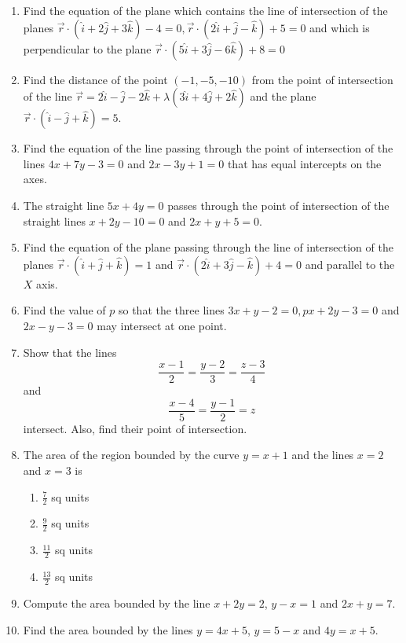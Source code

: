 \begin{enumerate}[label=\thesubsection.\arabic*, ref=\thesubsection.\theenumi]
\item Find the equation of the plane which contains the line of intersection of the planes $\overrightarrow{r}\cdot(\hat{i}+2\hat{j}+3\hat{k})-4=0,  \overrightarrow{r} \cdot  (2\hat{i}+\hat{j}-\hat{k})+5=0$ and which is perpendicular to the plane $\overrightarrow{r}\cdot(5\hat{i}+3\hat{j}-6\hat{k})+8=0$
\item Find the distance of the point $(-1, -5, -10)$ from the point of intersection of the line $\overrightarrow{r}=2\hat{i}-\hat{j}-2\hat{k}+\lambda(3\hat{i}+4\hat{j}+2\hat{k})$ and the plane $\overrightarrow{r}\cdot(\hat{i}-\hat{j}+\hat{k})=5$.
	\item Find the equation of the line passing through the point of intersection of the lines $4x + 7y - 3 = 0$ and $2x - 3y + 1 = 0$ that has equal intercepts on the axes.\\
	\solution 
	  
\item The straight line $5x+4y=0$ passes through the point of intersection of the straight lines $x+2y-10=0$ and $2x+y+5=0$.
\item Find the equation of the plane passing through the line of intersection of the planes  $\overrightarrow{r}\cdot(\hat{i}+\hat{j}+\hat{k})=1$ and $\overrightarrow{r}\cdot(2\hat{i}+3\hat{j}-\hat{k})+4=0$ and parallel to the $X$ axis.
\item
Find the value of $p$ so that the three lines $3x+y-2=0,  px+2y-3=0$ and $2x-y-3=0$ may intersect at one point.
\label{11.10.4.9}
\\
\solution

\item Show that the lines
$$\frac{x-1}{2}=\frac{y-2}{3}=\frac{z-3}{4}$$
 and 
$$ \frac{x-4}{5}=\frac{y-1}{2}=z  $$
 intersect.
 Also,  find their point of intersection.
\item The area of the region bounded by the curve $y = x + 1$ and the lines $x = 2$ and $x = 3$ is
	\begin{enumerate}[itemsep=1ex]
\item $\frac{7}{2}$ sq units
\item $\frac{9}{2}$ sq units
\item $\frac{11}{2}$ sq units
\item $\frac{13}{2}$ sq units
\end{enumerate}   
\item Compute the area bounded by the line $x + 2y = 2$,  $y - x = 1$ and $2x + y = 7$.
\item Find the area bounded by the lines $y = 4x + 5$,  $y = 5 - x$ and $4y = x + 5$.

\end{enumerate}
